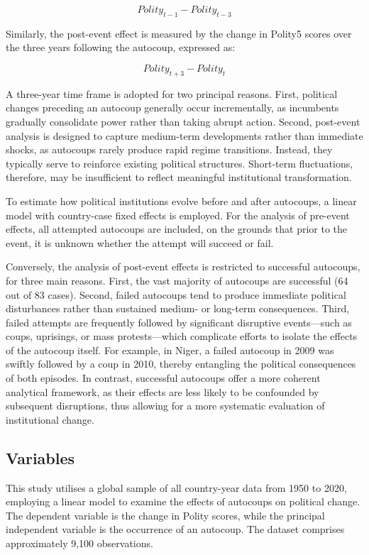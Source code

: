 \documentclass[
  12pt,
]{report}
\begin{document}
\[
Polity_{t-1} - Polity_{t-3}
\]

Similarly, the post-event effect is measured by the change in Polity5
scores over the three years following the autocoup, expressed as:

\[
Polity_{t+3} - Polity_t
\]

A three-year time frame is adopted for two principal reasons. First,
political changes preceding an autocoup generally occur incrementally,
as incumbents gradually consolidate power rather than taking abrupt
action. Second, post-event analysis is designed to capture medium-term
developments rather than immediate shocks, as autocoups rarely produce
rapid regime transitions. Instead, they typically serve to reinforce
existing political structures. Short-term fluctuations, therefore, may
be insufficient to reflect meaningful institutional transformation.

To estimate how political institutions evolve before and after
autocoups, a linear model with country-case fixed effects is employed.
For the analysis of pre-event effects, all attempted autocoups are
included, on the grounds that prior to the event, it is unknown whether
the attempt will succeed or fail.

Conversely, the analysis of post-event effects is restricted to
successful autocoups, for three main reasons. First, the vast majority
of autocoups are successful (64 out of 83 cases). Second, failed
autocoups tend to produce immediate political disturbances rather than
sustained medium- or long-term consequences. Third, failed attempts are
frequently followed by significant disruptive events---such as coups,
uprisings, or mass protests---which complicate efforts to isolate the
effects of the autocoup itself. For example, in Niger, a failed autocoup
in 2009 was swiftly followed by a coup in 2010, thereby entangling the
political consequences of both episodes. In contrast, successful
autocoups offer a more coherent analytical framework, as their effects
are less likely to be confounded by subsequent disruptions, thus
allowing for a more systematic evaluation of institutional change.

\subsection*{Variables}\label{variables}

This study utilises a global sample of all country-year data from 1950
to 2020, employing a linear model to examine the effects of autocoups on
political change. The dependent variable is the change in Polity scores,
while the principal independent variable is the occurrence of an
autocoup. The dataset comprises approximately 9,100 observations.
\end{document}
